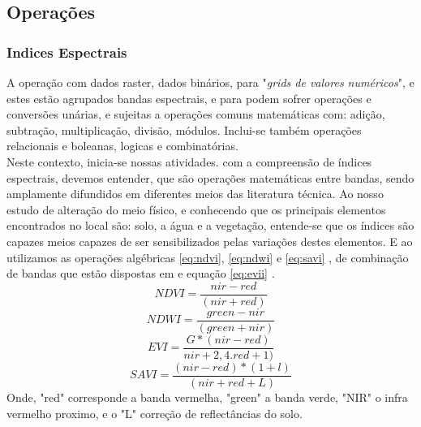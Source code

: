   \subsection{Operações}  
    \subsubsection{Indices Espectrais}
 \hspace*{1.25 cm} A operação com dados raster, dados binários, para \cite[106]{Dormam} "\textit{grids de valores numéricos}", e estes estão agrupados bandas espectrais, e para \cite[p.178 e p.181]{Liu}  podem sofrer operações e conversões unárias, e sujeitas a operações comuns matemáticas com: adição, subtração, multiplicação, divisão, módulos. Inclui-se também operações relacionais e boleanas, logicas e combinatórias.  \\
 \hspace*{1.25 cm}  Neste contexto, inicia-se nossas atividades. com a compreensão de índices espectrais, devemos entender, que são operações matemáticas entre bandas, sendo amplamente difundidos em diferentes meios das literatura técnica. Ao nosso estudo de alteração do meio físico, e conhecendo que os principais elementos encontrados no local são: solo, a água e a vegetação, entende-se  que  os índices  são capazes meios capazes de ser sensibilizados pelas variações destes elementos. E ao utilizamos as operações algébricas  \eqref{eq:ndvi}, \eqref{eq:ndwi} e \eqref{eq:savi} , de combinação de bandas que estão dispostas em \cite[p.165]{Thekapbail} e equação  \eqref{eq:evii} \cite[p.7]{Thekapbail}. 
 \begin{equation} \label{eq:ndvi}
 	 NDVI = \dfrac{nir - red}{ (nir + red) }
 \end{equation}
 \begin{equation}\label{eq:ndwi}
	NDWI = \dfrac{green - nir}{ (green + nir) }
\end{equation}
 \begin{equation}\label{eq:evii}
	EVI = \dfrac{G*(nir - red)}{ nir + 2,4. red +1) }
\end{equation}
 \begin{equation}\label{eq:savi}
	SAVI = \dfrac{(nir - red)*(1 +l)}{ (nir + red +L) }
\end{equation}
%
\hspace*{1.25 cm} Onde, "red" corresponde a banda vermelha, "green" a banda verde, "NIR" o infra vermelho proximo, e o "L" correção de reflectâncias do solo.\\
